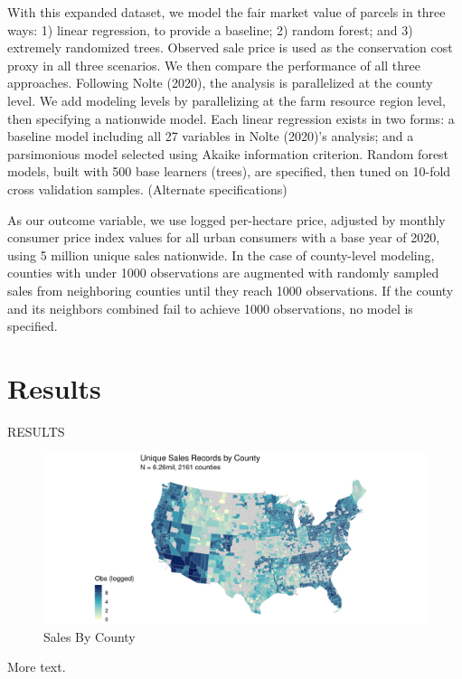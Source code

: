 \documentclass[12pt]{article}
\begin{document}
With this expanded dataset, we model the fair market value of parcels in three ways: 1) linear regression, to provide a baseline; 2) random forest; and 3) extremely randomized trees. Observed sale price is used as the conservation cost proxy in all three scenarios. We then compare the performance of all three approaches. Following Nolte (2020), the analysis is parallelized at the county level. We add modeling levels by parallelizing at the farm resource region level, then specifying a nationwide model. Each linear regression exists in two forms: a baseline model including all 27 variables in Nolte (2020)’s analysis; and a parsimonious model selected using Akaike information criterion. Random forest models, built with 500 base learners (trees), are specified, then tuned on 10-fold cross validation samples. (Alternate specifications)

As our outcome variable, we use logged per-hectare price, adjusted by monthly consumer price index values for all urban consumers with a base year of 2020, using 5 million unique sales nationwide. In the case of county-level modeling, counties with under 1000 observations are augmented with randomly sampled sales from neighboring counties until they reach 1000 observations. If the county and its neighbors combined fail to achieve 1000 observations, no model is specified.   

\newpage

\section{Results}

RESULTS

\begin{figure}
    \centering
    \includegraphics[width=6in]{eda_images/countysales_log.png}
    \caption{Sales By County}
    \label{fig:sales_county}
\end{figure}

More text.
\end{document}
